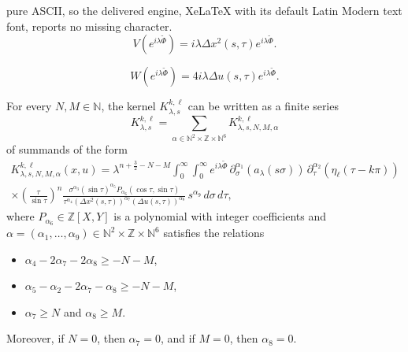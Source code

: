 \documentclass[10pt,a4paper]{amsart}
\newcommand\la{{\lambda}}
\newcommand{\N}{\mathbb{N}}
\newcommand{\Z}{\mathbb{Z}}
\begin{document}
pure ASCII, so the delivered engine, XeLaTeX with its default Latin Modern text font, reports no missing character.
\begin{equation}\label{VPhi}
V( e^{i \lambda \tilde \Phi}) =i\la \Delta x^2 (s,\tau)e^{i \lambda \tilde \Phi}.
\end{equation}

\begin{equation}\label{WPhi}
W (e^{i \lambda  \tilde\Phi} )=4 i\la \Delta u(s,\tau)e^{i \lambda \tilde \Phi}.
\end{equation}

\begin{lemma}\label{lem:decay-away-2}
For every $N,M\in\N$, the kernel $K_{\lambda,s}^{k,\ell}$ can be written as a finite series
\[
K_{\lambda,s}^{k,\ell} = \sum_{\alpha\in \N^2 \times \Z\times \N^6} K_{\lambda,s,N,M,\alpha}^{k,\ell}
\]
of summands of the form
\begin{multline*}
K_{\lambda,s,N,M,\alpha}^{k,\ell}(x, u)
 = 
\lambda^{n + \frac{3}{2}-N-M} \int_0^\infty \int_0^\infty  e^{i \lambda \tilde \Phi} \,\partial_\sigma^{\alpha_1} (a_{\lambda}(s \sigma))\, \partial_\tau^{\alpha_2}(\eta_\ell(\tau-k \pi))\\
\times \left(\frac{\tau}{\sin \tau}\right)^{n} \frac{\sigma^{\alpha_3} \left(\sin \tau\right)^{\alpha_5} P_{\alpha_6}(\cos\tau,\sin\tau)}{\tau^{\alpha_ 4 } \left( \Delta x^2 (s,\tau) \right)^{\alpha_7}\left( \Delta u(s,\tau) \right)^{\alpha_8} } \, s^{\alpha_9} \, d\sigma \, d \tau,
\end{multline*}
where $P_{\alpha_6}\in \Z[X,Y]$ is a polynomial with integer coefficients and $\alpha = (\alpha_1,\dots,\alpha_9)\in \N^2 \times \Z\times \N^6$ satisfies the relations
\begin{itemize}
 \item $\alpha_ 4 -2\alpha_7-2\alpha_8\ge -N-M$,
 \item $\alpha_5-\alpha_2-2\alpha_7-\alpha_8\ge -N-M$,
 \item $\alpha_7\ge N$ and $\alpha_8\ge M$.
\end{itemize}
Moreover, if $N = 0$, then $\alpha_7 = 0$, and if $M = 0$, then $\alpha_8 = 0$.
\end{lemma}
\end{document}
